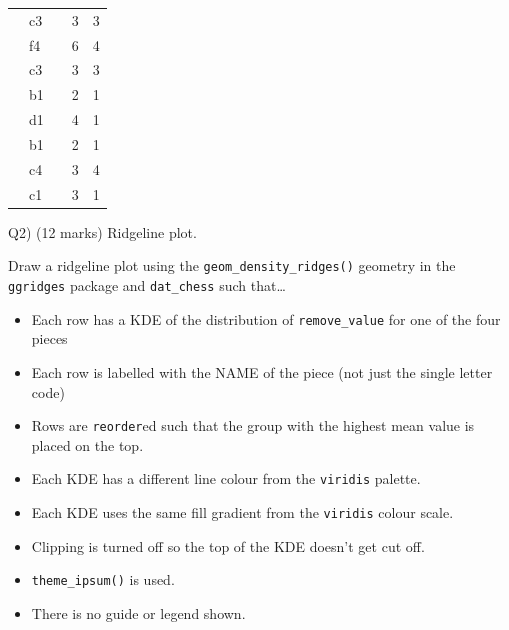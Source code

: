 \documentclass[
]{article}
\providecommand{\tightlist}{%
  \setlength{\itemsep}{0pt}\setlength{\parskip}{0pt}}
\begin{document}
\begin{table}[!t]
\begin{tabular*}{\linewidth}{@{\extracolsep{\fill}}llrrr}
{\cellcolor[HTML]{00FF00}{\textcolor[HTML]{000000}{N}}} & {c3} & {\cellcolor[HTML]{3DC5FF}{\textcolor[HTML]{000000}{556}}} & {3} & {3} \\ 
{\cellcolor[HTML]{FF0000}{\textcolor[HTML]{FFFFFF}{B}}} & {f4} & {\cellcolor[HTML]{3AC6FF}{\textcolor[HTML]{000000}{544}}} & {6} & {4} \\ 
{\cellcolor[HTML]{00FF00}{\textcolor[HTML]{000000}{N}}} & {c3} & {\cellcolor[HTML]{36C7FF}{\textcolor[HTML]{000000}{527}}} & {3} & {3} \\ 
{\cellcolor[HTML]{00FF00}{\textcolor[HTML]{000000}{N}}} & {b1} & {\cellcolor[HTML]{35C8FF}{\textcolor[HTML]{000000}{520}}} & {2} & {1} \\ 
{\cellcolor[HTML]{FF00FF}{\textcolor[HTML]{FFFFFF}{R}}} & {d1} & {\cellcolor[HTML]{2CCAFF}{\textcolor[HTML]{000000}{488}}} & {4} & {1} \\ 
{\cellcolor[HTML]{00FF00}{\textcolor[HTML]{000000}{N}}} & {b1} & {\cellcolor[HTML]{2ACAFF}{\textcolor[HTML]{000000}{483}}} & {2} & {1} \\ 
{\cellcolor[HTML]{FF0000}{\textcolor[HTML]{FFFFFF}{B}}} & {c4} & {\cellcolor[HTML]{22CCFF}{\textcolor[HTML]{000000}{462}}} & {3} & {4} \\ 
{\cellcolor[HTML]{FF0000}{\textcolor[HTML]{FFFFFF}{B}}} & {c1} & {\cellcolor[HTML]{22CCFF}{\textcolor[HTML]{000000}{461}}} & {3} & {1} \\ 
\bottomrule
\end{tabular*}
\end{table}

\newpage

Q2) (12 marks) Ridgeline plot.

Draw a ridgeline plot using the \texttt{geom\_density\_ridges()}
geometry in the \texttt{ggridges} package and \texttt{dat\_chess} such
that\ldots{}

\begin{itemize}
\tightlist
\item
  Each row has a KDE of the distribution of \texttt{remove\_value} for
  one of the four pieces
\item
  Each row is labelled with the NAME of the piece (not just the single
  letter code)
\item
  Rows are \texttt{reorder}ed such that the group with the highest mean
  value is placed on the top.
\item
  Each KDE has a different line colour from the \texttt{viridis}
  palette.
\item
  Each KDE uses the same fill gradient from the \texttt{viridis} colour
  scale.
\item
  Clipping is turned off so the top of the KDE doesn't get cut off.
\item
  \texttt{theme\_ipsum()} is used.
\item
  There is no guide or legend shown.
\end{itemize}
\end{document}
